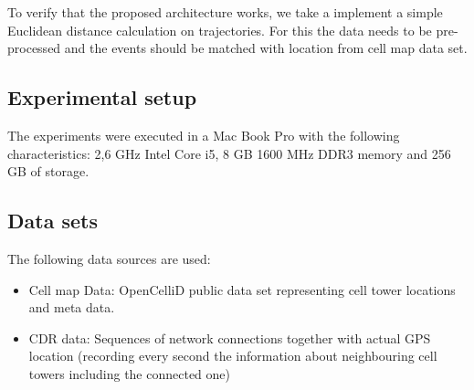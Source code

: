 To verify that the proposed architecture works, we take a implement a simple Euclidean distance calculation on trajectories. For this the data needs to be pre-processed and the events should be matched with location from cell map data set.

\subsection{Experimental setup}
The experiments were executed in a Mac Book Pro with the following characteristics: 2,6 GHz Intel Core i5, 8 GB 1600 MHz DDR3 memory and 256 GB of storage.

\subsection{Data sets}
The following data sources are used:
\begin{itemize}
\item Cell map Data: OpenCelliD public data set representing cell tower locations and meta data.
\item CDR data: Sequences of network connections together with actual GPS location (recording every second the information about neighbouring cell towers including the connected one)
\end{itemize}

